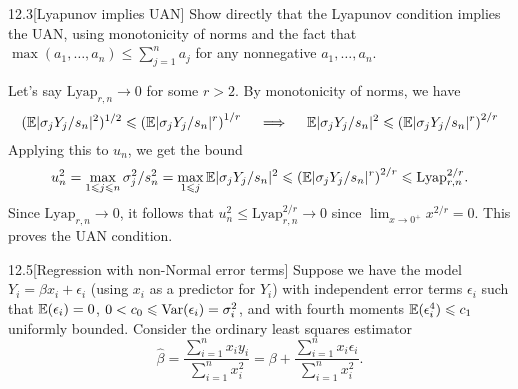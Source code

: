 \documentclass{pset}
\begin{document}
\begin{problem}{12.3}[Lyapunov implies UAN] Show directly that the Lyapunov condition implies the UAN, using monotonicity of norms and the fact that $\max(a_1,\ldots, a_n) \leq \sum^n_{j=1} a_j$ for any nonnegative $a_1,\ldots, a_n$.
\end{problem}

\begin{solution}
  Let's say $\textrm{Lyap}_{r,n}\to 0$ for some $r > 2$. By monotonicity of norms, we have
  \[
    (\mathbb{E}|\sigma_j Y_j / s_n|^2)^{1/2} \leqslant \left(\mathbb{E}|\sigma_j Y_j/s_n|^r\right)^{1/r} 
    \quad\implies\quad 
    \mathbb{E}|\sigma_j Y_j / s_n|^2 \leqslant \left(\mathbb{E}|\sigma_j Y_j/s_n|^r\right)^{2/r} 
  \]
  Applying this to $u_n$, we get the bound
  \[
    u_n^2 = \max_{1\leqslant j\leqslant n} \sigma_j^2/s_n^2 = \max_{1\leqslant j} \mathbb{E}|\sigma_jY_j/s_n|^2 \leqslant \left(\mathbb{E}|\sigma_j Y_j/s_n|^r\right)^{2/r} \leqslant \textrm{Lyap}^{2/r}_{r,n}.
  \]
  Since $\textrm{Lyap}_{r,n} \to 0$, it follows that $u_n^2\leq \textrm{Lyap}_{r,n}^{2/r} \to 0$ since $\lim_{x\to 0^+} x^{2/r} = 0$. This proves the UAN condition.
\end{solution}

\begin{problem}{12.5}[Regression with non-Normal error terms]
  Suppose we have the model $Y_i = \beta x_i + \epsilon_i$ (using $x_i$ as a predictor for $Y_i$) with independent error terms $\epsilon_i$ such that $\mathbb{E}(\epsilon_i)=0$, $0<c_0 \leqslant \textrm{Var}(\epsilon_i)=\sigma_i^2$, and with fourth moments $\mathbb{E}(\epsilon_i^4)\leqslant c_1$ uniformly bounded. Consider the ordinary least squares estimator
  \[
    \widehat{\beta} = \frac{\sum^n_{i=1} x_iy_i}{\sum^n_{i=1} x_i^2} = \beta + \frac{\sum^n_{i=1} x_i\epsilon_i}{\sum^n_{i=1} x_i^2}.
  \]
\end{problem}
\end{document}

